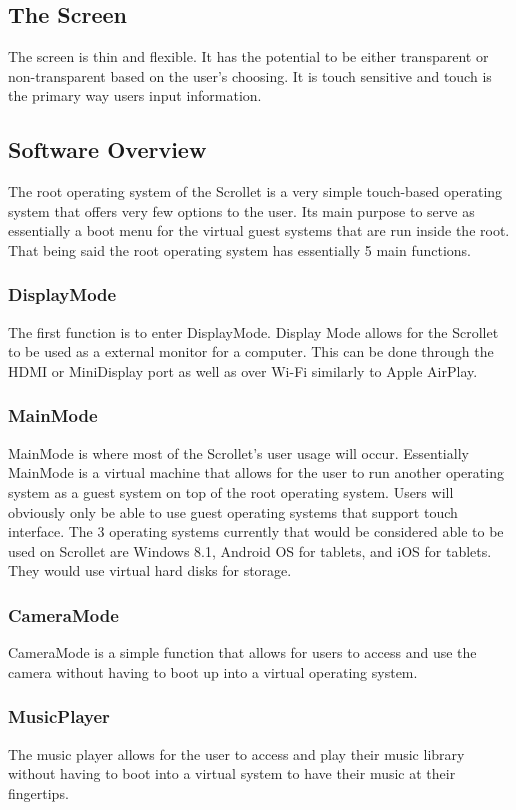 \documentclass[a4paper]{article}
\begin{document}
\subsection{The Screen}
The screen is thin and flexible. It has the potential to be either transparent or non-transparent based on the user's choosing. It is touch sensitive and touch is the primary way users input information.

\subsection{Software Overview}
The root operating system of the Scrollet is a very simple touch-based operating system that offers very few options to the user. Its main purpose to serve as essentially a boot menu for the virtual guest systems that are run inside the root. That being said the root operating system has essentially 5 main functions.

\subsubsection{DisplayMode}
The first function is to enter DisplayMode. Display Mode allows for the Scrollet to be used as a external monitor for a computer. This can be done through the HDMI or MiniDisplay port as well as over Wi-Fi similarly to Apple AirPlay.

\subsubsection{MainMode}
MainMode is where most of the Scrollet's user usage will occur. Essentially MainMode is a virtual machine that allows for the user to run another operating system as a guest system on top of the root operating system. Users will obviously only be able to use guest operating systems that support touch interface. The 3 operating systems currently that would be considered able to be used on Scrollet are Windows 8.1, Android OS for tablets, and iOS for tablets. They would use virtual hard disks for storage.

\subsubsection{CameraMode}
CameraMode is a simple function that allows for users to access and use the camera without having to boot up into a virtual operating system.

\subsubsection{MusicPlayer}
The music player allows for the user to access and play their music library without having to boot into a virtual system to have their music at their fingertips.
\end{document}
